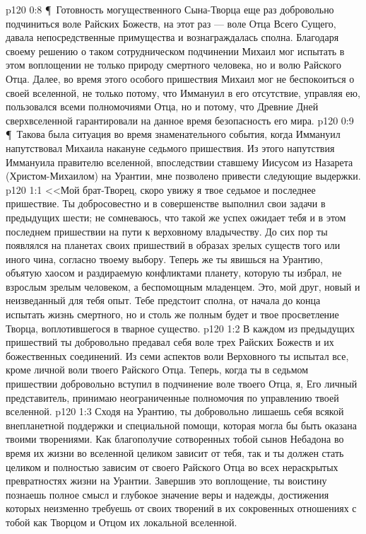 \vs p120 0:8 \P\ Готовность могущественного Сына\hyp{}Творца еще раз добровольно подчиниться воле Райских Божеств, на этот раз --- воле Отца Всего Сущего, давала непосредственные примущества и вознаграждалась сполна. Благодаря своему решению о таком сотрудническом подчинении Михаил мог испытать в этом воплощении не только природу смертного человека, но и волю Райского Отца. Далее, во время этого особого пришествия Михаил мог не беспокоиться о своей вселенной, не только потому, что Иммануил в его отсутствие, управляя ею, пользовался всеми полномочиями Отца, но и потому, что Древние Дней сверхвселенной гарантировали на данное время безопасность его мира.
\vs p120 0:9 \P\ Такова была ситуация во время знаменательного события, когда Иммануил напутствовал Михаила накануне седьмого пришествия. Из этого напутствия Иммануила правителю вселенной, впоследствии ставшему Иисусом из Назарета (Христом\hyp{}Михаилом) на Урантии, мне позволено привести следующие выдержки.
\vs p120 1:1 <<Мой брат\hyp{}Творец, скоро увижу я твое седьмое и последнее пришествие. Ты добросовестно и в совершенстве выполнил свои задачи в предыдущих шести; не сомневаюсь, что такой же успех ожидает тебя и в этом последнем пришествии на пути к верховному владычеству. До сих пор ты появлялся на планетах своих пришествий в образах зрелых существ того или иного чина, согласно твоему выбору. Теперь же ты явишься на Урантию, объятую хаосом и раздираемую конфликтами планету, которую ты избрал, не взрослым зрелым человеком, а беспомощным младенцем. Это, мой друг, новый и неизведанный для тебя опыт. Тебе предстоит сполна, от начала до конца испытать жизнь смертного, но и столь же полным будет и твое просветление Творца, воплотившегося в тварное существо.
\vs p120 1:2 В каждом из предыдущих пришествий ты добровольно предавал себя воле трех Райских Божеств и их божественных соединений. Из семи аспектов воли Верховного ты испытал все, кроме личной воли твоего Райского Отца. Теперь, когда ты в седьмом пришествии добровольно вступил в подчинение воле твоего Отца, я, Его личный представитель, принимаю неограниченные полномочия по управлению твоей вселенной.
\vs p120 1:3 Сходя на Урантию, ты добровольно лишаешь себя всякой внепланетной поддержки и специальной помощи, которая могла бы быть оказана твоими творениями. Как благополучие сотворенных тобой сынов Небадона во время их жизни во вселенной целиком зависит от тебя, так и ты должен стать целиком и полностью зависим от своего Райского Отца во всех нераскрытых превратностях жизни на Урантии. Завершив это воплощение, ты воистину познаешь полное смысл и глубокое значение веры и надежды, достижения которых неизменно требуешь от своих творений в их сокровенных отношениях с тобой как Творцом и Отцом их локальной вселенной.
